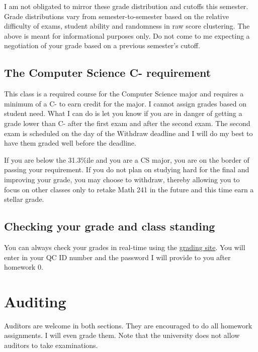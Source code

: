 \documentclass[12pt]{article}
\begin{document}
I am not obligated to mirror these grade distribution and cutoffs this semester. Grade distributions vary from semester-to-semester based on the relative difficulty of exams, student ability and randomness in raw score clustering. The above is meant for informational purposes only. Do not come to me expecting a negotiation of your grade based on a previous semester's cutoff.

\subsection*{The Computer Science C- requirement}

This class is a required course for the Computer Science major and requires a minimum of a C- to earn credit for the major. I cannot assign grades based on student need. What I can do is let you know if you are in danger of getting a grade lower than C- after the first exam and after the second exam. The second exam is scheduled on the day of the Withdraw deadline and I will do my best to have them graded well before the deadline. 

If you are below the 31.3\%ile and you are a CS major, you are on the border of passing your requirement. If you do not plan on studying hard for the final and improving your grade, you may choose to withdraw, thereby allowing you to focus on other classes only to retake Math 241 in the future and this time earn a stellar grade.

\subsection*{Checking your grade and class standing}

You can always check your grades in real-time using the \href{http://kapelner.com/grades}{grading site}. You will enter in your QC ID number and the password I will provide to you after homework 0.


\section*{Auditing}

Auditors are welcome in both sections. They are encouraged to do all homework assignments. I will even grade them. Note that the university does not allow auditors to take examinations.
\end{document}
